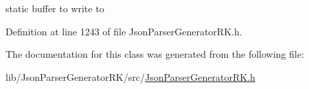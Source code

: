 static buffer to write to 



Definition at line 1243 of file Json\+Parser\+Generator\+R\+K.\+h.



The documentation for this class was generated from the following file\+:\begin{DoxyCompactItemize}
\item 
lib/\+Json\+Parser\+Generator\+R\+K/src/\hyperlink{_json_parser_generator_r_k_8h}{Json\+Parser\+Generator\+R\+K.\+h}\end{DoxyCompactItemize}
